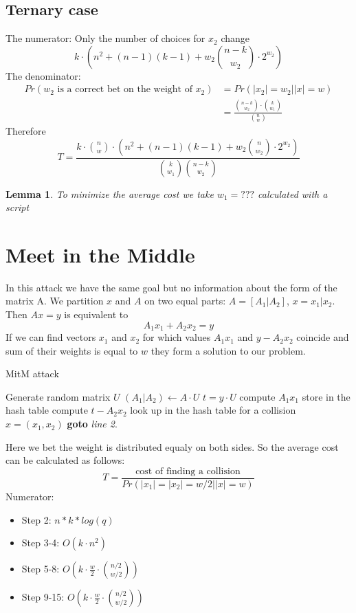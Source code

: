 \documentclass[12pt]{article}
\newtheorem{lemma}{Lemma}
\begin{document}
\subsection{Ternary case}
The numerator:
Only the number of choices for $x_2$ change
\[
    k\cdot(n^2 + (n-1)(k-1) + w_2\binom{n-k}{w_2}\cdot2^{w_2})
\]
The denominator:
\[
\begin{split}
    Pr(w_2\text{ is a correct bet on the weight of }x_2) & = Pr(|x_2| = w_2||x| = w) \\
    & = \frac{\binom{n-k}{w_2} \cdot \binom{k}{w_1}}{\binom{n}{w}}
\end{split}
\]
Therefore
\[
T = \frac{k\cdot\binom{n}{w}\cdot(n^2 + (n-1)(k-1) + w_2\binom{n}{w_2}\cdot2^{w_2})}{\binom{k}{w_1}\binom{n-k}{w_2}}
\]
\begin{lemma}
To minimize the average cost we take $w_1 = ???$ calculated with a script
\end{lemma}
\section{Meet in the Middle}
In this attack we have the same goal but no information about the form of the matrix A.
We partition $x$ and $A$ on two equal parts: $A = [A_1 | A_2]$, $x = x_1 | x_2$.
Then $Ax = y$ is equivalent to
\[
    A_1x_1 + A_2x_2 = y
\]
If we can find vectors $x_1$ and $x_2$ for which values $A_1x_1$ and $y - A_2x_2$ coincide
and sum of their weights is equal to $w$ they form a solution to our problem.


\begin{algorithm}
\caption{MitM attack}\label{MitM}
\begin{algorithmic}[1]
    \State Generate random matrix $U$
    \State $(A_1|A_2) \gets A \cdot U$
    \State $t = y \cdot U$
    \State compute $A_1x_1$
    \State store in the hash table
    \EndFor
    \State compute $t - A_2x_2$
    \State look up in the hash table for a collision
        \State \Return $x = (x_1, x_2)$
    \EndIf
    \EndFor
\State \textbf{goto} \emph{line 2}.
\EndProcedure
\end{algorithmic}
\end{algorithm}


Here we bet the weight is distributed equaly on both sides. So the average cost can be calculated as follows:
\[
  T = \frac{\text{cost of finding a collision}}{Pr(|x_1| = |x_2| = w/2| |x| =w)}
\]
Numerator:
\begin{itemize}
    \item Step 2: $n*k*log(q)$
    \item Step 3-4: $O(k \cdot n^2)$
    \item Step 5-8: $O(k \cdot \frac{w}{2} \cdot \binom{n/2}{w/2})$
    \item Step 9-15: $O(k \cdot \frac{w}{2} \cdot \binom{n/2}{w/2})$
\end{itemize}
\end{document}
